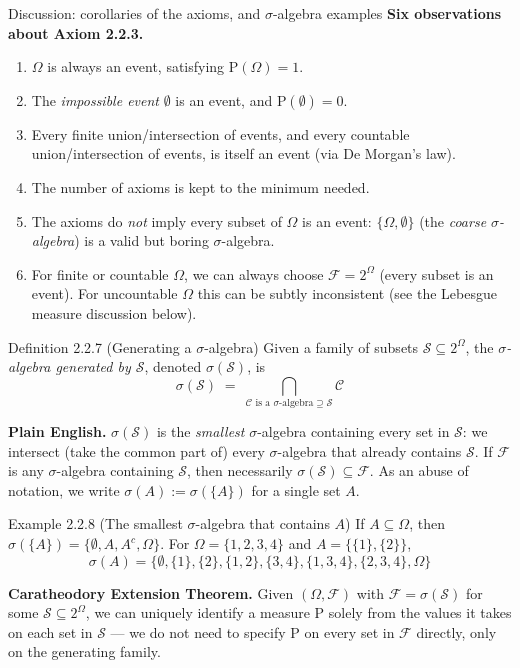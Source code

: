 \documentclass[aspectratio=169,10pt]{beamer}
\begin{document}
\begin{frame}[allowframebreaks]{Discussion: corollaries of the axioms, and $\sigma$-algebra examples}
\textbf{Six observations about Axiom 2.2.3.}
\begin{enumerate}
\item $\Omega$ is always an event, satisfying $\mathrm{P}(\Omega)=1$.
\item The \emph{impossible event} $\emptyset$ is an event, and $\mathrm{P}(\emptyset)=0$.
\item Every finite union/intersection of events, and every countable union/intersection of events, is itself an event (via De Morgan's law).
\item The number of axioms is kept to the minimum needed.
\item The axioms do \emph{not} imply every subset of $\Omega$ is an event: $\{\Omega,\emptyset\}$ (the \emph{coarse $\sigma$-algebra}) is a valid but boring $\sigma$-algebra.
\item For finite or countable $\Omega$, we can always choose $\mathcal{F}=2^{\Omega}$ (every subset is an event). For uncountable $\Omega$ this can be subtly inconsistent (see the Lebesgue measure discussion below).
\end{enumerate}

\framebreak

\begin{block}{Definition 2.2.7 (Generating a $\sigma$-algebra)}
Given a family of subsets $\mathcal{S}\subseteq 2^{\Omega}$, the
\emph{$\sigma$-algebra generated by $\mathcal{S}$}, denoted $\sigma(\mathcal{S})$, is
\[ \sigma(\mathcal{S}) \;=\; \bigcap_{\mathcal{C}\text{ is a $\sigma$-algebra}\supseteq\mathcal{S}} \mathcal{C} \]
\end{block}
\textbf{Plain English.} $\sigma(\mathcal{S})$ is the \emph{smallest}
$\sigma$-algebra containing every set in $\mathcal{S}$: we intersect (take
the common part of) every $\sigma$-algebra that already contains
$\mathcal{S}$. If $\mathcal{F}$ is any $\sigma$-algebra containing
$\mathcal{S}$, then necessarily $\sigma(\mathcal{S})\subseteq\mathcal{F}$. As
an abuse of notation, we write $\sigma(A):=\sigma(\{A\})$ for a single set $A$.

\begin{block}{Example 2.2.8 (The smallest $\sigma$-algebra that contains $A$)}
If $A\subseteq\Omega$, then $\sigma(\{A\}) = \{\emptyset,A,A^c,\Omega\}$. For
$\Omega=\{1,2,3,4\}$ and $A=\{\{1\},\{2\}\}$,
\[ \sigma(A) = \{\emptyset,\{1\},\{2\},\{1,2\},\{3,4\},\{1,3,4\},\{2,3,4\},\Omega\} \]
\end{block}
\textbf{Caratheodory Extension Theorem.} Given $(\Omega,\mathcal{F})$ with
$\mathcal{F}=\sigma(\mathcal{S})$ for some $\mathcal{S}\subseteq 2^\Omega$, we
can uniquely identify a measure $\mathrm{P}$ solely from the values it takes
on each set in $\mathcal{S}$ --- we do not need to specify $\mathrm{P}$ on
every set in $\mathcal{F}$ directly, only on the generating family.
\end{frame}
\end{document}
